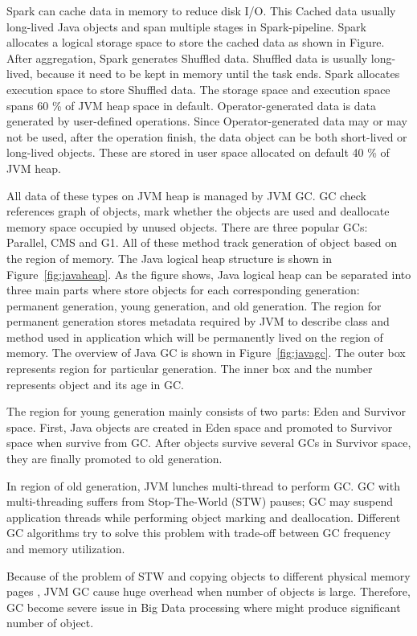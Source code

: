 Spark can cache data in memory to reduce disk I/O. This Cached data usually long-lived Java objects and span multiple stages in Spark-pipeline. 
Spark allocates a logical storage space to store the cached data as shown in Figure. After aggregation, Spark generates Shuffled data. Shuffled data is usually long-lived, 
because it need to be kept in memory until the task ends. Spark allocates execution space to store Shuffled data.
The storage space and execution space spans 60 \% of JVM heap space in default. Operator-generated data is data generated by user-defined operations. Since Operator-generated data may or may not be used, 
after the operation finish, the data object can be both short-lived or long-lived objects. These are stored in user space allocated on default 40 \% of JVM heap.

All data of these types on JVM heap is managed by JVM GC. GC check references graph of objects, mark whether the objects are used and deallocate memory space occupied by unused objects. 
There are three popular GCs: Parallel, CMS and G1. All of these method track generation of object based on the region of memory. 
The Java logical heap structure is shown in Figure~\ref{fig:javaheap}. As the figure shows, Java logical heap can be separated into three main parts where store objects for each corresponding generation: 
permanent generation, young generation, and old generation. The region for permanent generation stores metadata required by JVM to describe 
class and method used in application which will be permanently lived on the region of memory. The overview of Java GC is shown in Figure~\ref{fig:javagc}. 
The outer box represents region for particular generation. The inner box and the number represents object and its age in GC. 

The region for young generation mainly consists of two parts: Eden and Survivor space. 
First, Java objects are created in Eden space and promoted to Survivor space when survive from GC. 
After objects survive several GCs in Survivor space, they are finally promoted to old generation.

In region of old generation, JVM lunches multi-thread to perform GC. GC with multi-threading suffers from Stop-The-World (STW) pauses; 
GC may suspend application threads while performing object marking and deallocation. 
Different GC algorithms try to solve this problem with trade-off between GC frequency and memory utilization. 

Because of the problem of STW and copying objects to different physical memory pages , JVM GC cause huge overhead when number of objects is large. 
Therefore, GC become severe issue in Big Data processing where might produce significant number of object.

